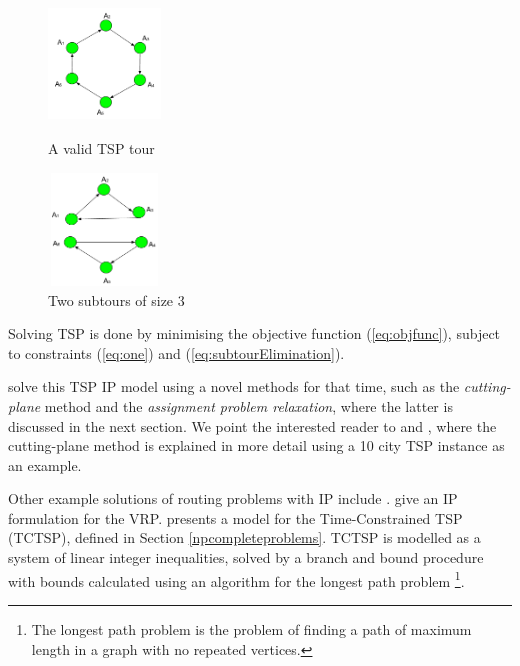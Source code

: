\documentclass{mpaper}
\begin{document}
\begin{figure}
\centering
\begin{minipage}{.5\textwidth}
  \centering
  \includegraphics[width=3cm, height=3cm]{images/valid.png}
  \caption{A valid TSP tour}
  \label{fig:tour}
\end{minipage}%
\begin{minipage}{.5\textwidth}
  \centering
  \includegraphics[width=3cm, height=3cm]{images/invalid.png}
  \caption{Two subtours of size 3}
  \label{fig:subtours}
\end{minipage}
\end{figure}

Solving TSP is done by minimising the objective function (\ref{eq:objfunc}), subject to constraints (\ref{eq:one}) and (\ref{eq:subtourElimination}).

\citet{Dantzig54} solve this TSP IP model using a novel methods for that time, such as the \textit{cutting-plane} method and the \textit{assignment problem relaxation}, where the latter is discussed in the next section. We point the interested reader to \cite{Dantzig54} and \cite{Dantzig59}, where the cutting-plane method is explained in more detail using a 10 city TSP instance as an example.

Other example solutions of routing problems with IP include \cite{Achuthan91, Baker83}. \citet{Achuthan91} give an IP formulation for the VRP.
\citet{Baker83} presents a model for the Time-Constrained TSP (TCTSP), defined in Section \ref{npcompleteproblems}. TCTSP is modelled as a system of linear integer inequalities, solved by a branch and bound procedure with bounds calculated using an algorithm for the longest path problem \footnote{The longest path problem is the problem of finding a path of maximum length in a graph with no repeated vertices.}. 
\end{document}
